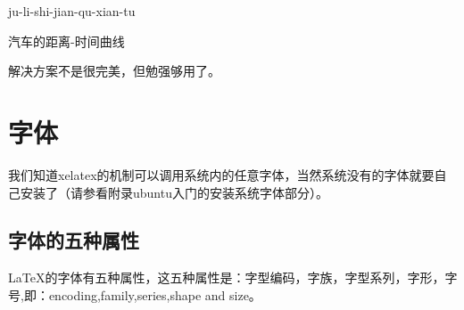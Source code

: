\documentclass[11pt,oneside]{book}
\begin{document}
  \noindent
  \begin{minipage}{\textwidth}
    \begin{minipage}{0.3\textwidth}
      \begin{table}[H]
        \centering
        \medskip
        \caption*{表 2-1}
      \end{table}

    \end{minipage}\hfill
    \begin{minipage}{0.7\textwidth}
      \begin{linefig}[0.9]{ju-li-shi-jian-qu-xian-tu}
        \caption{汽车的距离-时间曲线}
        \label{fig:ju-li-shi-jian-qu-xian-tu}
      \end{linefig}
    \end{minipage}
  \end{minipage}

  解决方案不是很完美，但勉强够用了。





  \chapter{字体}
  我们知道xelatex的机制可以调用系统内的任意字体，当然系统没有的字体就要自己安装了（请参看附录ubuntu入门的安装系统字体部分）。

  \section{字体的五种属性}
  \LaTeX 的字体有五种属性，这五种属性是：字型编码，字族，字型系列，字形，字号,即：encoding,family,series,shape and size。
\end{document}
